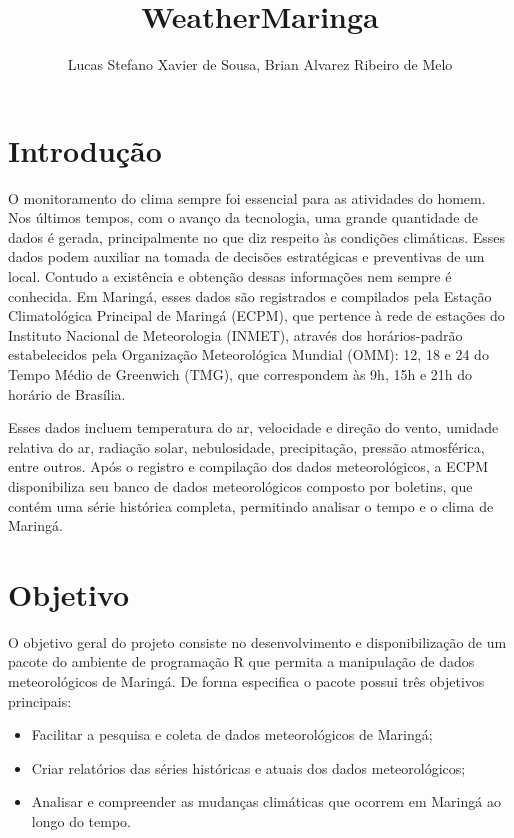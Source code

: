 \documentclass[final]{beamer}
\title
[XVI Semana da Estatística da UEM 5 - 7 Dezembro de 2022] %
{ %
WeatherMaringa
}
\author{ %
Lucas Stefano Xavier de Sousa\inst{1}, Brian Alvarez Ribeiro de Melo\inst{1}
}
\institute
[Universidade Estadual de Maringá] %
{
\inst{1} Departamento de Estatística - Universidade Estadual de Maringá\\[0.3ex]
}
\begin{document}
\begin{frame}[t]
\begin{multicols}{2}

\section{Introdução}

O monitoramento do clima sempre foi essencial para as atividades do homem. Nos últimos
tempos, com o avanço da tecnologia, uma grande quantidade de dados é gerada, principalmente no que
diz respeito às condições climáticas. Esses dados podem auxiliar na tomada de decisões estratégicas e
preventivas de um local. Contudo a existência e obtenção dessas informações nem sempre é conhecida.
Em Maringá, esses dados são registrados e compilados pela Estação Climatológica Principal de Maringá
(ECPM), que pertence à rede de estações do Instituto Nacional de Meteorologia (INMET), através dos
horários-padrão estabelecidos pela Organização Meteorológica Mundial (OMM): 12, 18 e 24 do Tempo
Médio de Greenwich (TMG), que correspondem às 9h, 15h e 21h do horário de Brasília.

Esses dados incluem temperatura do ar, velocidade e direção do vento, umidade relativa do ar, radiação solar, nebulosidade, precipitação, pressão atmosférica, entre outros. Após o registro e compilação dos dados meteorológicos, a ECPM disponibiliza seu banco de dados meteorológicos composto por boletins, que contém uma série histórica completa, permitindo analisar o tempo e o clima de Maringá.

\section{Objetivo}

O objetivo geral do projeto consiste no desenvolvimento e disponibilização de um pacote do ambiente de programação R que permita a manipulação de dados meteorológicos de Maringá. De forma especifica o pacote possui três objetivos principais:
\begin{itemize}
  \item Facilitar a pesquisa e coleta de dados meteorológicos de Maringá;
  \item Criar relatórios das séries históricas e atuais dos dados meteorológicos;
  \item Analisar e compreender as mudanças climáticas que ocorrem em Maringá ao longo do tempo.
\end{itemize}



\end{multicols}
\end{frame}
\end{document}
